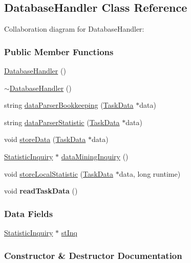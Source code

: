 \hypertarget{a00011}{}\subsection{Database\+Handler Class Reference}
\label{a00011}


Collaboration diagram for Database\+Handler\+:
\subsubsection*{Public Member Functions}
\begin{DoxyCompactItemize}
\item 
\hyperlink{a00011_ac27357d3431faf4fd6810483a24a43fd}{Database\+Handler} ()
\item 
\hyperlink{a00011_a54cc84549167c9d6a94ba686cf64a27f}{$\sim$\+Database\+Handler} ()
\item 
string \hyperlink{a00011_acb8ccbee3347b22557108ccd1b58de08}{data\+Parser\+Bookkeeping} (\hyperlink{a00003}{Task\+Data} $\ast$data)
\item 
string \hyperlink{a00011_a97f7f624920dbce0dc8d388faff2d370}{data\+Parser\+Statistic} (\hyperlink{a00003}{Task\+Data} $\ast$data)
\item 
void \hyperlink{a00011_af0f1d44b27165b6737433e6750b6aa1e}{store\+Data} (\hyperlink{a00003}{Task\+Data} $\ast$data)
\item 
\hyperlink{a00001}{Statistic\+Inquiry} $\ast$ \hyperlink{a00011_a90a9c6f8b7c8af0e71d1107568b7f72f}{data\+Mining\+Inquiry} ()
\item 
void \hyperlink{a00011_a7e67913b3d03bbc407b9a8fa7cbabf0e}{store\+Local\+Statistic} (\hyperlink{a00003}{Task\+Data} $\ast$data, long runtime)
\item 
\hypertarget{a00011_a320b7f44af4b03225c4b6f9eaec568d0}{}void {\bfseries read\+Task\+Data} ()\label{a00011_a320b7f44af4b03225c4b6f9eaec568d0}

\end{DoxyCompactItemize}
\subsubsection*{Data Fields}
\begin{DoxyCompactItemize}
\item 
\hyperlink{a00001}{Statistic\+Inquiry} $\ast$ \hyperlink{a00011_acb152e98fa5b111b16e22f4a5b896756}{st\+Inq}
\end{DoxyCompactItemize}


\subsubsection{Constructor \& Destructor Documentation}
\hypertarget{a00011_ac27357d3431faf4fd6810483a24a43fd}{}
